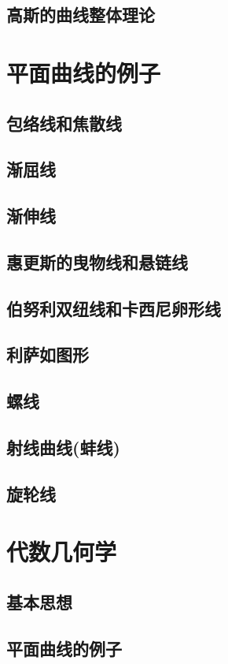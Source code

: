 \section{高斯的曲线整体理论}

\chapter{平面曲线的例子}
\section{包络线和焦散线}
\section{渐屈线}
\section{渐伸线}
\section{惠更斯的曳物线和悬链线}
\section{伯努利双纽线和卡西尼卵形线}
\section{利萨如图形}
\section{螺线}
\section{射线曲线(蚌线)}
\section{旋轮线}

\chapter{代数几何学}
\section{基本思想}
\section{平面曲线的例子}
